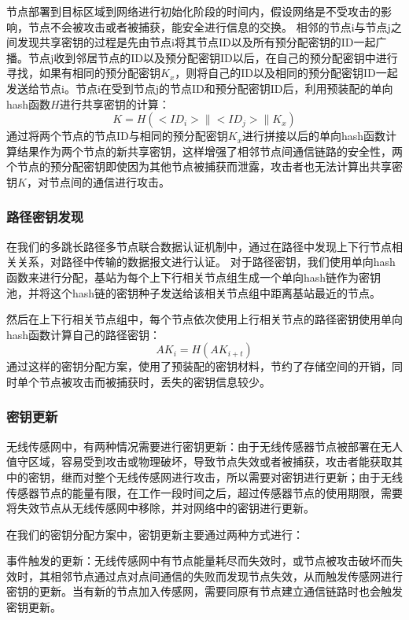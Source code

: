 节点部署到目标区域到网络进行初始化阶段的时间内，假设网络是不受攻击的影响，节点不会被攻击或者被捕获，能安全进行信息的交换。
相邻的节点i与节点j之间发现共享密钥的过程是先由节点i将其节点ID以及所有预分配密钥的ID一起广播。节点j收到邻居节点的ID以及预分配密钥ID以后，在自己的预分配密钥中进行寻找，如果有相同的预分配密钥$K_x$，则将自己的ID以及相同的预分配密钥ID一起发送给节点i。节点i在受到节点j的节点ID和预分配密钥ID后，利用预装配的单向hash函数$H$进行共享密钥的计算：
\begin{equation}
  K=H(<ID_i>\| <ID_j> \|K_x)
\end{equation}
通过将两个节点的节点ID与相同的预分配密钥$K_x$进行拼接以后的单向hash函数计算结果作为两个节点的新共享密钥，这样增强了相邻节点间通信链路的安全性，两个节点的预分配密钥即使因为其他节点被捕获而泄露，攻击者也无法计算出共享密钥$K$，对节点间的通信进行攻击。
\subsubsection{路径密钥发现}
在我们的多跳长路径多节点联合数据认证机制中，通过在路径中发现上下行节点相关关系，对路径中传输的数据报文进行认证。
对于路径密钥，我们使用单向hash函数来进行分配，基站为每个上下行相关节点组生成一个单向hash链作为密钥池，并将这个hash链的密钥种子发送给该相关节点组中距离基站最近的节点。

然后在上下行相关节点组中，每个节点依次使用上行相关节点的路径密钥使用单向hash函数计算自己的路径密钥：
\begin{equation}
  AK_i=H(AK_{i+t})
\end{equation}
通过这样的密钥分配方案，使用了预装配的密钥材料，节约了存储空间的开销，同时单个节点被攻击而被捕获时，丢失的密钥信息较少。
\subsubsection{密钥更新}
无线传感网中，有两种情况需要进行密钥更新：由于无线传感器节点被部署在无人值守区域，容易受到攻击或物理破坏，导致节点失效或者被捕获，攻击者能获取其中的密钥，继而对整个无线传感网进行攻击，所以需要对密钥进行更新；由于无线传感器节点的能量有限，在工作一段时间之后，超过传感器节点的使用期限，需要将失效节点从无线传感网中移除，并对网络中的密钥进行更新。

在我们的密钥分配方案中，密钥更新主要通过两种方式进行：

事件触发的更新：无线传感网中有节点能量耗尽而失效时，或节点被攻击破坏而失效时，其相邻节点通过点对点间通信的失败而发现节点失效，从而触发传感网进行密钥的更新。当有新的节点加入传感网，需要同原有节点建立通信链路时也会触发密钥更新。

